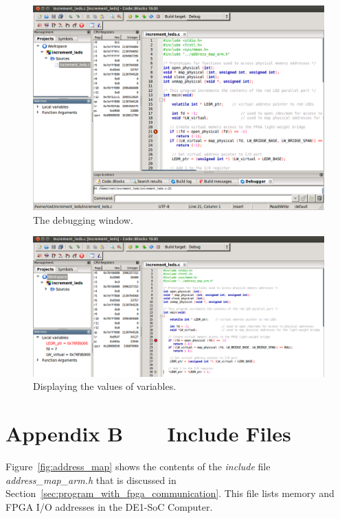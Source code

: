 \documentclass[11pt, twoside, pdftex]{article}
\begin{document}
\begin{figure} [h]
\begin{center}
\includegraphics[scale = .55]{figures/cb11.png}
\end{center}
\caption{The debugging window.}
\label{fig:cb11}
\end{figure}

\clearpage
\newpage
\begin{figure} [h]
\begin{center}
\includegraphics[scale = .55]{figures/cb12.png}
\end{center}
\caption{Displaying the values of variables.}
\label{fig:cb12}
\end{figure}

\newpage
\section*{Appendix B~~~~Include Files}

Figure~\ref{fig:address_map} shows the contents of the {\it include} file {\it address\_map\_arm.h}
that is discussed in Section~\ref{sec:program_with_fpga_communication}. This file lists
memory and FPGA I/O addresses in the DE1-SoC Computer. 
\end{document}
